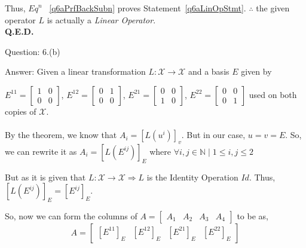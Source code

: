 \documentclass[a4paper]{article}
\begin{document}
\begin{qalist}
		Thus, ${Eq}^{n}$ ~\ref{q6aPrfBackSubn} proves Statement~\ref{q6aLinOpStmt}. $\therefore$ the given operator $L$ is actually a \textit{Linear Operator}. \\ \textbf{Q.E.D.}
		
		\item[Question: 6.(b)] \setcounter{equation}{0} 
		\item[Answer:] Given a linear transformation $L : \mathcal{X} \rightarrow \mathcal{X}$ and a basis $E$ given by 
		
		${E}^{11} = \begin{bmatrix}1 & 0 \\ 0 & 0 \end{bmatrix}$, ${E}^{12} = \begin{bmatrix}0 & 1 \\ 0 & 0 \end{bmatrix}$, ${E}^{21} = \begin{bmatrix}0 & 0 \\ 1 & 0 \end{bmatrix}$, ${E}^{22} = \begin{bmatrix}0 & 0 \\ 0 & 1 \end{bmatrix}$ used on both copies of $\mathcal{X}$.
%		
		\\ \\ By the theorem, we know that ${A}_{i} = {[L({u}^{i})]}_{v}$. But in our case, $u = v = E$. So, we can rewrite it as ${A}_{i} = {[L({E}^{ij})]}_{E}$ where $\forall i,j\in \mathbb{N} \; | \; 1 \leq i,j \leq 2$
		
		But as it is given that $L : \mathcal{X} \rightarrow \mathcal{X} \Rightarrow L$ is the Identity Operation $Id$. Thus, ${[L({E}^{ij})]}_{E} = {[{E}^{ij}]}_{E}$.
		
		So, now we can form the columns of $A = \begin{bmatrix} {A}_{1} & {A}_{2} & {A}_{3} & {A}_{4}\end{bmatrix}$ to be as, 
		\begin{equation}\label{q6bMatRepnForm}
			A = \begin{bmatrix} {[{E}^{11}]}_{E} & {[{E}^{12}]}_{E} & {[{E}^{21}]}_{E} & {[{E}^{22}]}_{E}\end{bmatrix}
		\end{equation}
		

\end{qalist}
\end{document}
